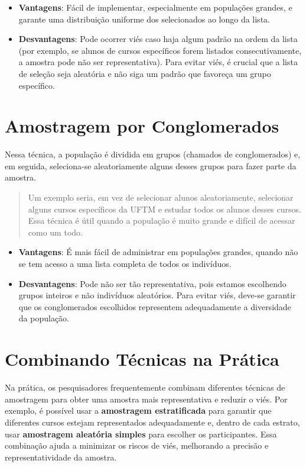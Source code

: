 \documentclass[
]{book}
\providecommand{\tightlist}{%
  \setlength{\itemsep}{0pt}\setlength{\parskip}{0pt}}
\begin{document}
\begin{itemize}
\tightlist
\item
  \textbf{Vantagens}: Fácil de implementar, especialmente em populações grandes, e garante uma distribuição uniforme dos selecionados ao longo da lista.
\item
  \textbf{Desvantagens}: Pode ocorrer viés caso haja algum padrão na ordem da lista (por exemplo, se alunos de cursos específicos forem listados consecutivamente, a amostra pode não ser representativa). Para evitar viés, é crucial que a lista de seleção seja aleatória e não siga um padrão que favoreça um grupo específico.
\end{itemize}

\section{Amostragem por Conglomerados}\label{amostragem-por-conglomerados}

Nessa técnica, a população é dividida em grupos (chamados de conglomerados) e, em seguida, seleciona-se aleatoriamente alguns desses grupos para fazer parte da amostra.

\begin{quote}
Um exemplo seria, em vez de selecionar alunos aleatoriamente, selecionar alguns cursos específicos da UFTM e estudar todos os alunos desses cursos. Essa técnica é útil quando a população é muito grande e difícil de acessar como um todo.
\end{quote}

\begin{itemize}
\tightlist
\item
  \textbf{Vantagens}: É mais fácil de administrar em populações grandes, quando não se tem acesso a uma lista completa de todos os indivíduos.
\item
  \textbf{Desvantagens}: Pode não ser tão representativa, pois estamos escolhendo grupos inteiros e não indivíduos aleatórios. Para evitar viés, deve-se garantir que os conglomerados escolhidos representem adequadamente a diversidade da população.
\end{itemize}

\section{Combinando Técnicas na Prática}\label{combinando-tuxe9cnicas-na-pruxe1tica}

Na prática, os pesquisadores frequentemente combinam diferentes técnicas de amostragem para obter uma amostra mais representativa e reduzir o viés. Por exemplo, é possível usar a \textbf{amostragem estratificada} para garantir que diferentes cursos estejam representados adequadamente e, dentro de cada estrato, usar \textbf{amostragem aleatória simples} para escolher os participantes. Essa combinação ajuda a minimizar os riscos de viés, melhorando a precisão e representatividade da amostra.
\end{document}

